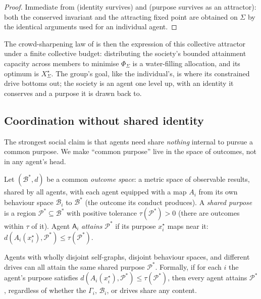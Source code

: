 \documentclass[11pt,twocolumn,a4paper]{article}
\newcommand{\Agent}{\mathsf{A}}
\newcommand{\Self}{\Gamma}          %
\newcommand{\Beh}{\mathcal{B}}       %
\newcommand{\Purp}{\mathcal{P}}      %
\newcommand{\Soc}{\Sigma}            %
\newcommand{\dist}{d}
\begin{document}
\begin{proof}
Immediate from  (identity survives) and
 (purpose survives as an attractor): both the
conserved invariant and the attracting fixed point are obtained on $\Soc$
by the identical arguments used for an individual agent.
\end{proof}

\begin{remark}
\label{rem:waterfill}
The crowd-sharpening law of  is then the expression of this
collective attractor under a finite collective budget: distributing the
society's bounded attainment capacity across members to minimise
$\Phi_\Soc$ is a water-filling allocation, and its optimum is
$X^\star_\Soc$. The group's goal, like the individual's, is where its
constrained drive bottoms out; the society is an agent one level up, with
an identity it conserves and a purpose it is drawn back to.
\end{remark}

\subsection{Coordination without shared identity}
\label{sec:coordwithout}

The strongest social claim is that agents need share \emph{nothing}
internal to pursue a common purpose. We make ``common purpose'' live in
the space of outcomes, not in any agent's head.

\begin{definition}
\label{def:outcome}
Let $(\Beh^\ast,\dist)$ be a common \emph{outcome space}: a metric space
of observable results, shared by all agents, with each agent equipped with
a map $A_i$ from its own behaviour space $\Beh_i$ to $\Beh^\ast$ (the
outcome its conduct produces). A \emph{shared purpose} is a region
$\Purp^\ast\subseteq\Beh^\ast$ with positive tolerance
$\tau(\Purp^\ast)>0$ (there are outcomes within $\tau$ of it). Agent
$\Agent_i$ \emph{attains} $\Purp^\ast$ if its purpose $x^\star_i$ maps
near it: $\dist(A_i(x^\star_i),\Purp^\ast)\le\tau(\Purp^\ast)$.
\end{definition}

\begin{theorem}
\label{thm:coord}
Agents with wholly disjoint self-graphs, disjoint behaviour spaces, and
different drives can all attain the same shared purpose
$\Purp^\ast$. Formally, if for each $i$ the agent's purpose satisfies
$\dist(A_i(x^\star_i),\Purp^\ast)\le\tau(\Purp^\ast)$, then every agent
attains $\Purp^\ast$, regardless of whether the $\Self_i$, $\Beh_i$, or
drives share any content.
\end{theorem}
\end{document}
